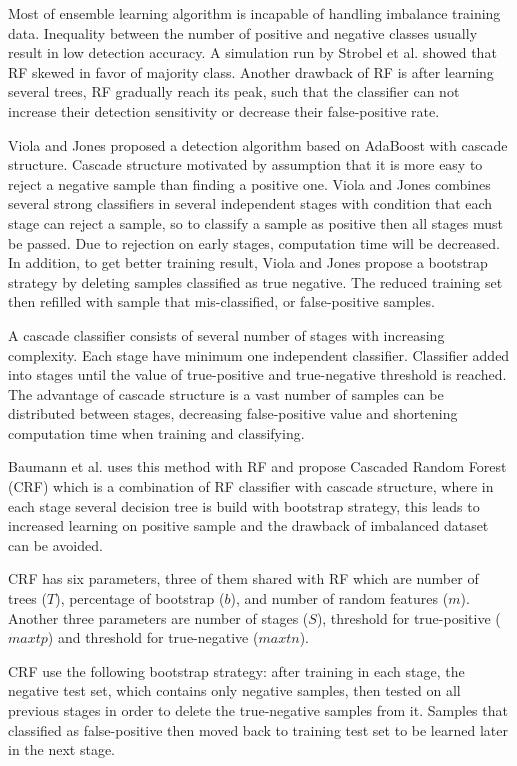 Most of ensemble learning algorithm is incapable of handling imbalance training
data.
Inequality between the number of positive and negative classes usually result in
low detection accuracy.
A simulation run by Strobel et al. \cite{strobl2007bias} showed that RF skewed
in favor of majority class.
Another drawback of RF is after learning several trees, RF gradually reach its
peak, such that the classifier can not increase their detection sensitivity or
decrease their false-positive rate.

Viola and Jones \cite{viola2004robust} proposed a detection algorithm based on
AdaBoost with cascade structure.
Cascade structure motivated by assumption that it is more easy to reject a
negative sample than finding a positive one.
Viola and Jones combines several strong classifiers in several independent
stages with condition that each stage can reject a sample, so to classify a
sample as positive then all stages must be passed.
Due to rejection on early stages, computation time will be decreased.
In addition, to get better training result, Viola and Jones propose a bootstrap
strategy by deleting samples classified as true negative.
The reduced training set then refilled with sample that mis-classified, or
false-positive samples.

A cascade classifier consists of several number of stages with increasing
complexity.
Each stage have minimum one independent classifier.
Classifier added into stages until the value of true-positive and true-negative
threshold is reached.
The advantage of cascade structure is a vast number of samples can be
distributed between stages, decreasing false-positive value and shortening
computation time when training and classifying.

Baumann et al. \cite{baumann2013cascaded} uses this method with RF and propose
Cascaded Random Forest (CRF) which is a combination of RF classifier with
cascade structure, where in each stage several decision tree is build with
bootstrap strategy, this leads to increased learning on positive sample and the
drawback of imbalanced dataset can be avoided.

CRF has six parameters, three of them shared with RF which are number of trees
($T$), percentage of bootstrap ($b$), and number of random features ($m$).
Another three parameters are number of stages ($S$), threshold
for true-positive ($maxtp$) and threshold for true-negative ($maxtn$).

CRF use the following bootstrap strategy: after training in each stage, the
negative test set, which contains only negative samples, then tested on all
previous stages in order to delete the true-negative samples from it.
Samples that classified as false-positive then moved back to training test set
to be learned later in the next stage.

